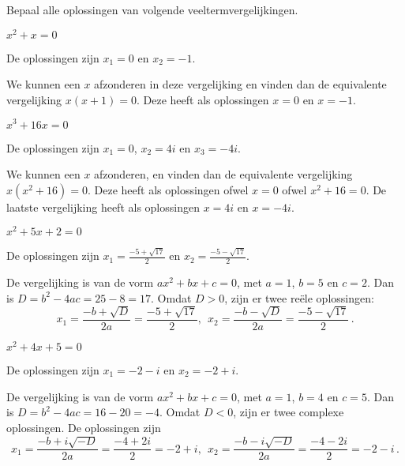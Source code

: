 \documentclass{ximera}
\begin{document}
\begin{exercise}
Bepaal alle oplossingen van volgende veeltermvergelijkingen.



\begin{question}
$ x^2 + x = 0$
\begin{oplossing}
De oplossingen zijn $x_1 = 0$ en $x_2 = -1$.

 We kunnen een $x$ afzonderen in deze vergelijking en vinden dan de equivalente vergelijking $x(x+1) = 0$. Deze heeft als oplossingen $x=0$ en $x=-1$.
\end{oplossing}
\end{question}

\begin{question}
$ x^3 + 16x = 0$
\begin{oplossing}
De oplossingen zijn $x_1 = 0$, $x_2 = 4i$ en $x_3 = -4i$.

 We kunnen een $x$ afzonderen, en vinden dan de equivalente vergelijking $x(x^2+16)=0$. Deze heeft als oplossingen ofwel $x=0$ ofwel $x^2 + 16 = 0$. De laatste vergelijking heeft als oplossingen $x=4i$ en $x=-4i$.
\end{oplossing}
\end{question}


\begin{question}
$ x^2 + 5x + 2 = 0$
\begin{oplossing}
De oplossingen zijn $x_1 = \frac{-5 + \sqrt{17}}{2}$ en $x_2 = \frac{-5 - \sqrt{17}}{2}$.

De vergelijking is van de vorm $ax^2 + bx + c = 0$, met $a=1$, $b=5$ en $c=2$. Dan is $D = b^2 - 4ac = 25-8 = 17$. Omdat $D > 0$, zijn er twee reële oplossingen:
$$
x_1 = \frac{-b + \sqrt{D}}{2a} = \frac{-5 + \sqrt{17}}{2}, \ \ x_2 = \frac{-b - \sqrt{D}}{2a} = \frac{-5 - \sqrt{17}}{2} \, .
$$
\end{oplossing}
\end{question}

\begin{question}
$ x^2 + 4x + 5 = 0$
\begin{oplossing}
De oplossingen zijn $x_1 = -2 - i$ en $x_2 = -2 + i$.

 De vergelijking is van de vorm $ax^2 + bx + c = 0$, met $a=1$, $b=4$ en $c=5$. Dan is $D = b^2 - 4ac = 16 - 20 = -4$. Omdat $D < 0$, zijn er twee complexe oplossingen. De oplossingen zijn
$$
x_1 = \frac{-b + i\sqrt{-D}}{2a} = \frac{-4 + 2i}{2} = -2 + i, \ \ x_2 = \frac{-b - i\sqrt{-D}}{2a} = \frac{-4 - 2i}{2} = -2 - i \, .
$$
\end{oplossing}
\end{question}





\end{exercise}
\end{document}
